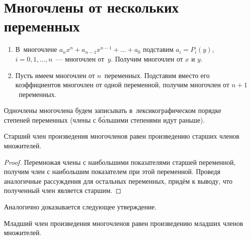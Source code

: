 \section{Многочлены от нескольких переменных}
\begin{enumerate}
	\item В~многочлене $a_n x^n + a_{n-1} x^{n-1} + \ldots + a_0$ подставим $a_i = P_i(y)$, $i = 0, 1, \ldots, n$~--- многочлен от~$y$.
	Получим многочлен от $x$ и $y$.
	
	\item Пусть имеем многочлен от $n$~переменных.
	Подставим вместо его коэффициентов многочлен от одной переменной, получим многочлен от $n + 1$~переменных.
\end{enumerate}

Одночлены многочлена будем записывать в~лексикографическом порядке степеней переменных (члены с б\'{о}льшими степенями идут раньше).

\begin{statement}
Старший член произведения многочленов равен произведению старших членов множителей.
\end{statement}
\begin{proof}
Перемножая члены с наибольшими показателями старшей переменной, получим член с наибольшим показателем при этой переменной.
Проведя аналогичные рассуждения для остальных переменных, придём к выводу, что полученный член является старшим.
\end{proof}

Аналогично доказывается следующее утверждение.
\begin{statement}
Младший член произведения многочленов равен произведению младших членов множителей.
\end{statement}